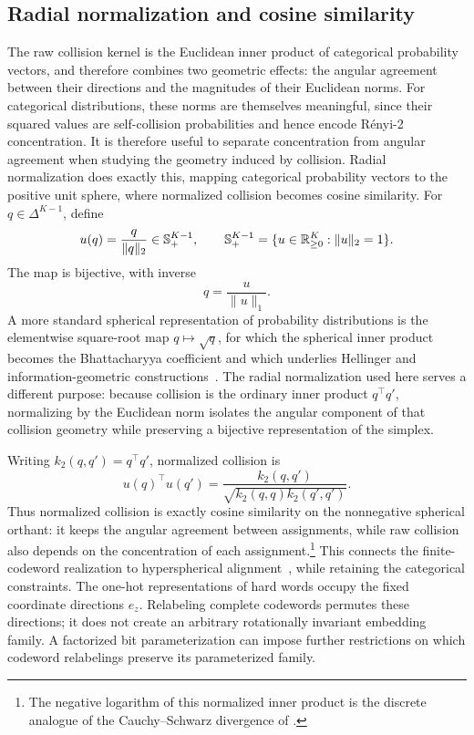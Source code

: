 \subsection{Radial normalization and cosine similarity}

The raw collision kernel is the Euclidean inner product of categorical probability vectors, and therefore combines two geometric effects: the angular agreement between their directions and the magnitudes of their Euclidean norms.
For categorical distributions, these norms are themselves meaningful, since their squared values are self-collision probabilities and hence encode R\'enyi-2 concentration.
It is therefore useful to separate concentration from angular agreement when studying the geometry induced by collision.
Radial normalization does exactly this, mapping categorical probability vectors to the positive unit sphere, where normalized collision becomes cosine similarity.
For $q\in\Delta^{K-1}$, define
\begin{equation}
u(q)=\frac{q}{\|q\|_2}\in\mathbb S_+^{K-1},\qquad
\mathbb S_+^{K-1}=\{u\in\mathbb{R}_{\ge0}^K:\|u\|_2=1\}.
\label{eq:sphere-map}
\end{equation}
The map is bijective, with inverse
\begin{equation}
q=\frac{u}{\|u\|_1}.
\label{eq:sphere-map-inverse}
\end{equation}
A more standard spherical representation of probability distributions is the elementwise square-root map $q\mapsto\sqrt q$, for which the spherical inner product becomes the Bhattacharyya coefficient and which underlies Hellinger and information-geometric constructions~\citep{amari2016information}.
The radial normalization used here serves a different purpose: because collision is the ordinary inner product $q^\top q'$, normalizing by the Euclidean norm isolates the angular component of that collision geometry while preserving a bijective representation of the simplex.

Writing $k_2(q,q')=q^\top q'$, normalized collision is
\begin{equation}
u(q)^\top u(q')
=\frac{k_2(q,q')}{\sqrt{k_2(q,q)k_2(q',q')}}.
\label{eq:normalized-collision}
\end{equation}
Thus normalized collision is exactly cosine similarity on the nonnegative spherical orthant: it keeps the angular agreement between assignments, while raw collision also depends on the concentration of each assignment.\footnote{The negative logarithm of this normalized inner product is the discrete analogue of the Cauchy--Schwarz divergence of \citet{jenssen2006cauchy}.}
This connects the finite-codeword realization to hyperspherical alignment~\citep{wang2020alignment}, while retaining the categorical constraints.
The one-hot representations of hard words occupy the fixed coordinate directions $e_z$.
Relabeling complete codewords permutes these directions; it does not create an arbitrary rotationally invariant embedding family.
A factorized bit parameterization can impose further restrictions on which codeword relabelings preserve its parameterized family.

